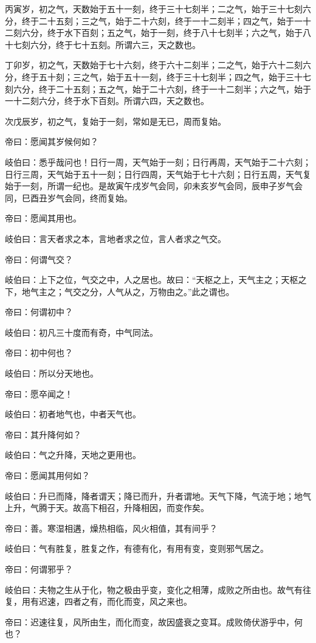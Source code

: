 \documentclass{article}%
\begin{document}
丙寅岁，初之气，天数始于五十一刻，终于三十七刻半；二之气，始于三十七刻六分，终于二十五刻；三之气，始于二十六刻，终于一十二刻半；四之气，始于一十二刻六分，终于水下百刻；五之气，始于一刻，终于八十七刻半；六之气，始于八十七刻六分，终于七十五刻。所谓六三，天之数也。

丁卯岁，初之气，天数始于七十六刻，终于六十二刻半；二之气，始于六十二刻六分，终于五十刻；三之气，始于五十一刻，终于三十七刻半；四之气，始于三十七刻六分，终于二十五刻；五之气，始于二十六刻，终于一十二刻半；六之气，始于一十二刻六分，终于水下百刻。所谓六四，天之数也。

次戊辰岁，初之气，复始于一刻，常如是无已，周而复始。

帝曰：愿闻其岁候何如？

岐伯曰：悉乎哉问也！日行一周，天气始于一刻；日行再周，天气始于二十六刻；日行三周，天气始于五十一刻；日行四周，天气始于七十六刻；日行五周，天气复始于一刻，所谓一纪也。是故寅午戌岁气会同，卯未亥岁气会同，辰申子岁气会同，巳酉丑岁气会同，终而复始。

帝曰：愿闻其用也。

岐伯曰：言天者求之本，言地者求之位，言人者求之气交。

帝曰：何谓气交？

岐伯曰：上下之位，气交之中，人之居也。故曰：“天枢之上，天气主之；天枢之下，地气主之；气交之分，人气从之，万物由之。”此之谓也。

帝曰：何谓初中？

岐伯曰：初凡三十度而有奇，中气同法。

帝曰：初中何也？

岐伯曰：所以分天地也。

帝曰：愿卒闻之！

岐伯曰：初者地气也，中者天气也。

帝曰：其升降何如？

岐伯曰：气之升降，天地之更用也。

帝曰：愿闻其用何如？

岐伯曰：升已而降，降者谓天；降已而升，升者谓地。天气下降，气流于地；地气上升，气腾于天。故高下相召，升降相因，而变作矣。

帝曰：善。寒湿相遘，燥热相临，风火相值，其有间乎？

岐伯曰：气有胜复，胜复之作，有德有化，有用有变，变则邪气居之。

帝曰：何谓邪乎？

岐伯曰：夫物之生从于化，物之极由乎变，变化之相薄，成败之所由也。故气有往复，用有迟速，四者之有，而化而变，风之来也。

帝曰：迟速往复，风所由生，而化而变，故因盛衰之变耳。成败倚伏游乎中，何也？
\end{document}
